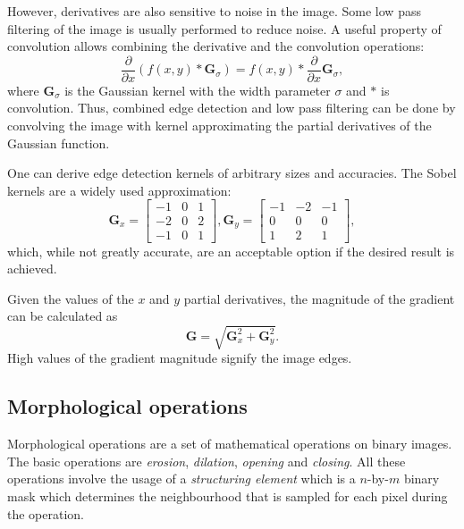 \documentclass[a4paper,twoside,12pt]{article}
\begin{document}
However, derivatives are also sensitive to noise in the image. Some low pass filtering of the image is usually performed to reduce noise. A useful property of convolution allows combining the derivative and the convolution operations:
\begin{equation}
    \frac{\partial}{\partial x} (f(x, y) \ast \mathbf{G}_\sigma) =
    f(x, y) \ast \frac{\partial}{\partial x} \mathbf{G}_\sigma,
\end{equation}
where $\mathbf{G}_\sigma$ is the Gaussian kernel with the width parameter $\sigma$ and $\ast$ is convolution. Thus, combined edge detection and low pass filtering can be done by convolving the image with kernel approximating the partial derivatives of the Gaussian function.

One can derive edge detection kernels of arbitrary sizes and accuracies. The Sobel kernels are a widely used approximation:
\begin{equation}
    \mathbf{G}_x = \begin{bmatrix}
        -1 & 0 & 1 \\
        -2 & 0 & 2 \\
        -1 & 0 & 1
    \end{bmatrix},
    \mathbf{G}_y = \begin{bmatrix}
        -1 & -2 & -1 \\
        0 & 0 & 0 \\
        1 & 2 & 1
    \end{bmatrix},
\end{equation}
which, while not greatly accurate, are an acceptable option if the desired result is achieved.

Given the values of the $x$ and $y$ partial derivatives, the magnitude of the gradient can be calculated as
\[
    \mathbf{G} = \sqrt{\mathbf{G}_x^2 + \mathbf{G}_y^2}.
\]
High values of the gradient magnitude signify the image edges.

\subsection{Morphological operations}
Morphological operations are a set of mathematical operations on binary images. The basic operations are \emph{erosion}, \emph{dilation}, \emph{opening} and \emph{closing}. All these operations involve the usage of a \emph{structuring element} which is a $n$-by-$m$ binary mask which determines the neighbourhood that is sampled for each pixel during the operation.
\end{document}
